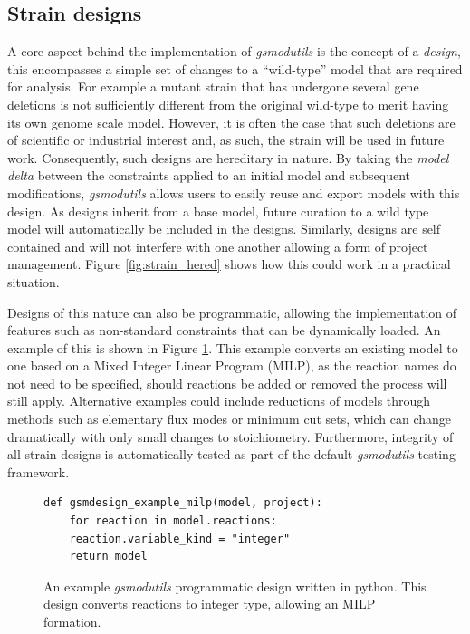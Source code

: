 \documentclass[journal=asbcd6,10pt]{achemso}
\begin{document}
\subsection{Strain designs}
A core aspect behind the implementation of \textit{gsmodutils} is the concept of a \textit{design}, this encompasses a simple set of changes to a ``wild-type'' model that are required for analysis.
For example a mutant strain that has undergone several gene deletions is not sufficiently different from the original wild-type to merit having its own genome scale model.
However, it is often the case that such deletions are of scientific or industrial interest and, as such, the strain will be used in future work.
Consequently, such designs are hereditary in nature.
By taking the \textit{model delta} between the constraints applied to an initial model and subsequent modifications, \textit{gsmodutils} allows users to easily reuse and export models with this design.
As designs inherit from a base model, future curation to a wild type model will automatically be included in the designs.
Similarly, designs are self contained and will not interfere with one another allowing a form of project management.
Figure \ref{fig:strain_hered} shows how this could work in a practical situation.

Designs of this nature can also be programmatic, allowing the implementation of features such as non-standard constraints that can be dynamically loaded.
An example of this is shown in Figure \ref{fig:programmatic_design}.
This example converts an existing model to one based on a Mixed Integer Linear Program (MILP), as the reaction names do not need to be specified, should reactions be added or removed the process will still apply.
Alternative examples could include reductions of models through methods such as elementary flux modes or minimum cut sets, which can change dramatically with only small changes to stoichiometry.
Furthermore, integrity of all strain designs is automatically tested as part of the default \textit{gsmodutils} testing framework.

\begin{figure}[ht]
\lstset{language=python}   
\begin{lstlisting}
def gsmdesign_example_milp(model, project):
    for reaction in model.reactions:
	reaction.variable_kind = "integer"
    return model
\end{lstlisting}
\caption{An example \textit{gsmodutils} programmatic design written in python. 
This design converts reactions to integer type, allowing an MILP formation.}
\label{fig:programmatic_design} 
\end{figure}
\end{document}
